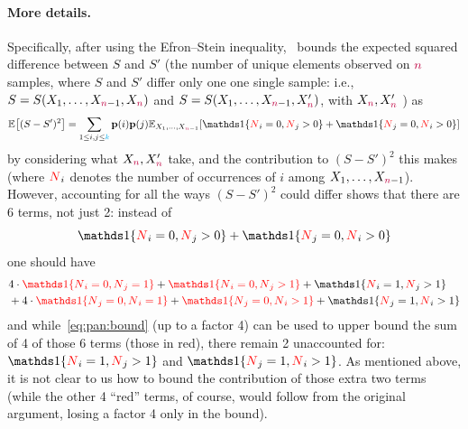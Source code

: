 \paragraph{More details.} Specifically, after using the Efron--Stein inequality,~\citet{Paninski08} bounds the expected squared difference between $S$ and $S'$ (the number of unique elements observed on ${\textcolor{purple}{n}}$ samples, where $S$ and $S'$ differ only one one single sample: i.e., $S=S(X_1,\dots,X_{{\textcolor{purple}{n}}-1}, X_{\textcolor{purple}{n}})$ and $S=S(X_1,\dots,X_{{\textcolor{purple}{n}}-1}, X'_{\textcolor{purple}{n}})$, with $X_{\textcolor{purple}{n}},X'_{\textcolor{purple}{n}}$ \iid) as
\[
  \bEE{(S-S')^2} = \sum_{1\leq i,j\leq \ab} \p(i)\p(j) \bE{X_1,\dots,X_{\ns-1}}{ \indic{\occur_i=0, \occur_j>0} + \indic{\occur_j=0, \occur_i>0} }
\]
by considering what $X_{\textcolor{purple}{n}},X'_{\textcolor{purple}{n}}$ take, and the contribution to $(S-S')^2$ this makes (where $\textcolor{red}{N}_i$ denotes the number of occurrences of $i$ among $X_1,\dots,X_{{\textcolor{purple}{n}}-1}$).
However, accounting for all the ways $(S-S')^2$ could differ shows that there are 6 terms, not just 2: instead of 
\begin{equation}
  \label{eq:pan:bound}
\indic{\occur_i=0, \occur_j>0} + \indic{\occur_j=0, \occur_i>0} 
\end{equation}
one should have
\begin{align*}
& 4\cdot \textcolor{red}{\indic{\occur_i=0, \occur_j=1}} + \textcolor{red}{\indic{\occur_i=0, \occur_j>1}} + \indic{\occur_i=1, \occur_j>1} \\
&+ 4\cdot \textcolor{red}{\indic{\occur_j=0, \occur_i=1}} + \textcolor{red}{\indic{\occur_j=0, \occur_i>1}} + \indic{\occur_j=1, \occur_i>1} 
\end{align*}
and while~\eqref{eq:pan:bound} (up to a factor 4) can be used to upper bound the sum of 4 of those 6 terms (those in red), there remain 2 unaccounted for:
$
\indic{\occur_i=1, \occur_j>1}
$
and 
$
\indic{\occur_j=1, \occur_i>1}
$. As mentioned above, it is not clear to us how to bound the contribution of those extra two terms (while the other 4 ``red'' terms, of course, would follow from the original argument, losing a factor 4 only in the bound).
\egroup
